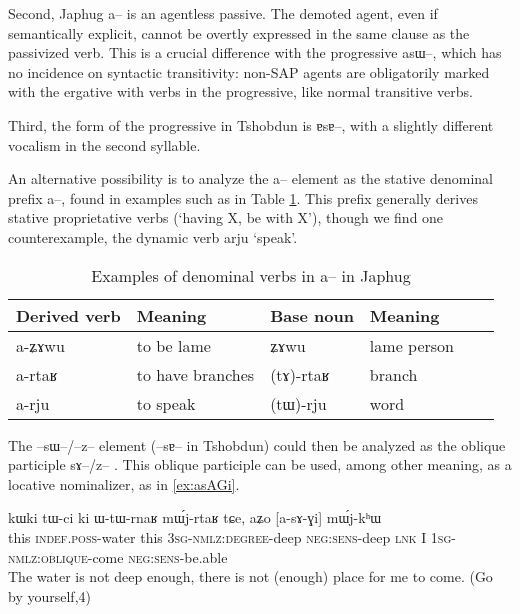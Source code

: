 \documentclass[oldfontcommands,oneside,a4paper,11pt]{article}
\newcommand{\ipa}[1]{{\phon \mbox{#1}}} %
\begin{document}
Second, Japhug \ipa{a--} is an agentless passive. The demoted agent, even if semantically explicit, cannot be overtly expressed in the same clause as the passivized verb. This is a crucial difference with the progressive \ipa{asɯ--}, which has no incidence on syntactic transitivity: non-SAP agents are obligatorily marked with the ergative with verbs in the progressive, like normal transitive verbs.


Third, the form of the progressive in Tshobdun is \ipa{ɐsɐ--}, with a slightly different vocalism in the second syllable.

An alternative possibility is to analyze the \ipa{a--} element as the stative denominal prefix \ipa{a--}, found in examples such as in Table \ref{tab:denom.a.ex}. This prefix generally derives stative proprietative verbs (`having X, be with X'), though we find one counterexample, the dynamic verb \ipa{arju} `speak'.


 \begin{table}[H] \label{tab:denom.a.ex} \centering
 \caption{Examples of denominal verbs in \ipa{a}--   in Japhug}
\begin{tabular}{llllll}
\toprule
   Derived verb& Meaning &Base noun  & Meaning \\
\midrule
  \ipa{a-ʑɤwu} & to be lame & \ipa{ʑɤwu} & lame person\\
  \ipa{a-rtaʁ} & to have branches & \ipa{(tɤ)-rtaʁ} & branch \\
  \ipa{a-rju} & to speak & \ipa{(tɯ)-rju} & word \\
\bottomrule
\end{tabular}
\end{table}

The  \ipa{--sɯ--/--z--} element (\ipa{--sɐ--} in Tshobdun) could then be analyzed as the oblique participle \ipa{sɤ--/z--} . This oblique participle can be used, among other meaning, as a locative nominalizer, as in \ref{ex:asAGi}.

\begin{exe}
   \ex \label{ex:asAGi}
 \gll
\ipa{kɯki}   	\ipa{tɯ-ci}   	\ipa{ki}   	\ipa{ɯ-tɯ-rnaʁ}   	\ipa{mɯ́j-rtaʁ}   	\ipa{tɕe,}   	\ipa{aʑo}   	[\ipa{a-sɤ-ɣi}]   	\ipa{mɯ́j-kʰɯ}   \\
this \textsc{indef.poss}-water this \textsc{3sg-nmlz:degree}-deep \textsc{neg:sens}-deep \textsc{lnk} I \textsc{1sg-nmlz:oblique}-come \textsc{neg:sens}-be.able \\
\glt The water is not deep enough, there is not (enough) place for me to come. (Go by yourself,4)
\end{exe}
\end{document}
